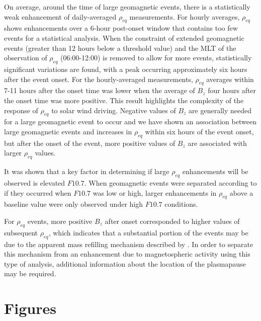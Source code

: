 \documentclass[12pt]{article}
\begin{document}
On average, around the time of large geomagnetic events, there is a statistically weak enhancement of daily-averaged $\rho_{eq}$ measurements. For hourly averages, $\rho_{eq}$ shows enhancements over a 6-hour post-onset window that contains too few events for a statistical analysis.  When the constraint of extended geomagnetic events (greater than 12 hours below a threshold value) and the MLT of the observation of $\rho_{eq}$ (06:00-12:00) is removed to allow for more events, statistically significant variations are found, with a peak occurring approximately six hours after the event onset.  For the hourly-averaged measurements, $\rho_{eq}$ averages within 7-11 hours after the onset time was lower when the average of $B_{z}$ four hours after the onset time was more positive.  This result highlights the complexity of the response of $\rho_{eq}$ to solar wind driving.  Negative values of $B_{z}$ are generally needed for a large geomagnetic event to occur and we have shown an association between large geomagnetic events and increases in $\rho_{eq}$ within six hours of the event onset, but after the onset of the event, more positive values of $B_z$ are associated with larger $\rho_{eq}$ values.

It was shown that a key factor in determining if large $\rho_{eq}$ enhancements will be observed is elevated $F10.7$.  When geomagnetic events were separated according to if they occurred when $F10.7$ was low or high, larger enhancements in $\rho_{eq}$ above a baseline value were only observed under high $F10.7$ conditions.

For $\rho_{eq}$ events, more positive $B_{z}$ after onset corresponded to higher values of subsequent $\rho_{eq}$, which indicates that a substantial portion of the events may be due to the apparent mass refilling mechanism described by \cite{Denton2016}.  In order to separate this mechanism from an enhancement due to magnetospheric activity using this type of analysis, additional information about the location of the plasmapause may be required.

\newpage
%


\clearpage

\section{Figures}
\end{document}
